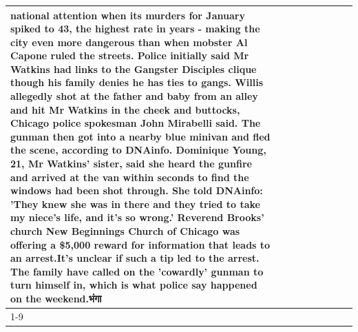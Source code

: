 \begin{table}[H]
\begin{tabular}{lllrlllll}
national attention when its murders for January spiked to 43, the highest rate in years - making the city even more dangerous than when mobster Al Capone ruled the streets. Police initially said Mr Watkins had links to the Gangster Disciples clique though his family denies he has ties to gangs. Willis allegedly shot at the father and baby from an alley and hit Mr Watkins in the cheek and buttocks, Chicago police spokesman John Mirabelli said. The gunman then got into a nearby blue minivan and fled the scene, according to DNAinfo. Dominique Young, 21, Mr Watkins' sister, said she heard the gunfire and arrived at the van within seconds to find the windows had been shot through. She told DNAinfo: 'They knew she was in there and they tried to take my niece's life, and it's so wrong.' Reverend Brooks' church New Beginnings Church of Chicago was offering a \$5,000 reward for information that leads to an arrest.It's unclear if such a tip led to the arrest. The family have called on the 'cowardly' gunman to turn himself in, which is what police say happened on the weekend.भंगा \\
\cline{1-9}

\end{tabular}
\end{table}
